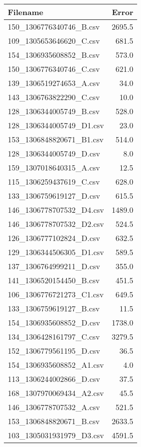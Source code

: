 \documentclass[conference]{IEEEtran}
\begin{document}
\begin{table}
\label{table:Error results}
\begin{tabular}{l | r }
	Filename & Error \\
	\hline
	150\_{}1306776340746\_{}B.csv & 2695.5 \\
	109\_{}1305653646620\_{}C.csv & 681.5 \\
	154\_{}1306935608852\_{}B.csv & 573.0 \\
	150\_{}1306776340746\_{}C.csv & 621.0 \\
	139\_{}1306519274653\_{}A.csv & 34.0 \\
	143\_{}1306763822290\_{}C.csv & 10.0 \\
	128\_{}1306344005749\_{}B.csv & 528.0 \\
	128\_{}1306344005749\_{}D1.csv & 23.0 \\
	153\_{}1306848820671\_{}B1.csv & 514.0 \\
	128\_{}1306344005749\_{}D.csv & 8.0 \\
	159\_{}1307018640315\_{}A.csv & 12.5 \\
	115\_{}1306259437619\_{}C.csv & 628.0 \\
	133\_{}1306759619127\_{}D.csv & 615.5 \\
	146\_{}1306778707532\_{}D4.csv & 1489.0 \\
	146\_{}1306778707532\_{}D2.csv & 524.5 \\
	126\_{}1306777102824\_{}D.csv & 632.5 \\
	129\_{}1306344506305\_{}D1.csv & 589.5 \\
	137\_{}1306764999211\_{}D.csv & 355.0 \\
	141\_{}1306520154450\_{}B.csv & 451.5 \\
	106\_{}1306776721273\_{}C1.csv & 649.5 \\
	133\_{}1306759619127\_{}B.csv & 11.5 \\
	154\_{}1306935608852\_{}D.csv & 1738.0 \\
	134\_{}1306428161797\_{}C.csv & 3279.5 \\
	152\_{}1306779561195\_{}D.csv & 36.5 \\
	154\_{}1306935608852\_{}A1.csv & 4.0 \\
	113\_{}1306244002866\_{}D.csv & 37.5 \\
	168\_{}1307970069434\_{}A2.csv & 45.5 \\
	146\_{}1306778707532\_{}A.csv & 521.5 \\
	153\_{}1306848820671\_{}B.csv & 2633.5 \\
	103\_{}1305031931979\_{}D3.csv & 4591.5 \\

\end{tabular}
\end{table}
\end{document}
